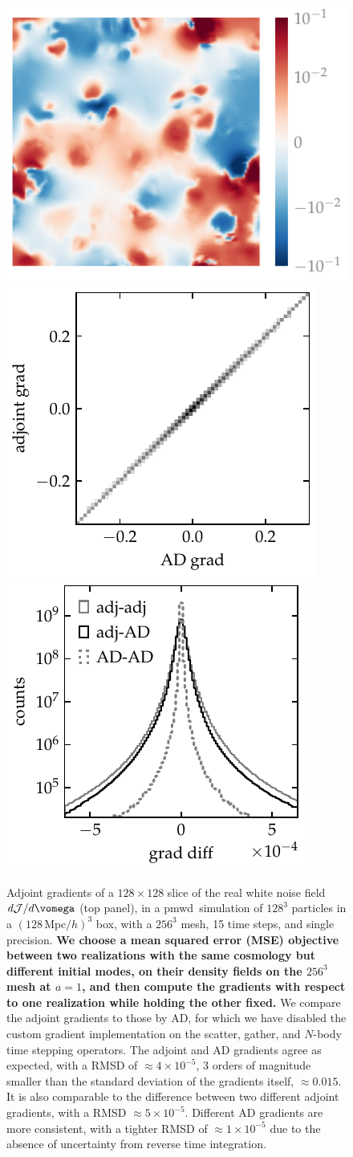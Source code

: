 \documentclass[modern, dvipsnames]{aastex631}
\newcommand{\pmwd}{{\usefont{T1}{nova}{m}{sl}pmwd}}
\renewcommand{\d}{d}
\newcommand{\cJ}{\mathcal{J}}
\newcommand{\Mpc}{\mathrm{Mpc}}
\newcommand{\HL}[1]{\textcolor{Bittersweet}{\textbf{#1}}}
\begin{document}
\begin{figure}[t]
\centering
\hspace{7em}
\includegraphics[width=0.5\linewidth]{grads.pdf}
\\
\vspace{1em}
\includegraphics[height=0.45\linewidth]{grads_cmp.pdf}
\hfill
\includegraphics[height=0.45\linewidth]{grads_diff.pdf}
\caption{Adjoint gradients of a $128\times128$ slice of the real white
noise field $\d\cJ / \d\vomega$ (top panel), in a \pmwd\ simulation of
$128^3$ particles in a $(128\,\Mpc/h)^3$ box, with a $256^3$ mesh, 15
time steps, and single precision.
\HL{We choose a mean squared error (MSE) objective between two realizations
with the same cosmology but different initial modes, on their density
fields on the $256^3$ mesh at $a=1$, and then compute the gradients with
respect to one realization while holding the other fixed.}
We compare the adjoint gradients to those by AD, for which we have
disabled the custom gradient implementation on the scatter, gather, and
$N$-body time stepping operators.
The adjoint and AD gradients agree as expected, with a RMSD of $\approx
4\times10^{-5}$, 3 orders of magnitude smaller than the standard
deviation of the gradients itself, $\approx 0.015$.
It is also comparable to the difference between two different adjoint
gradients, with a RMSD $\approx 5\times10^{-5}$.
Different AD gradients are more consistent, with a tighter RMSD of
$\approx 1\times10^{-5}$ due to the absence of uncertainty from reverse
time integration.
}
\label{fig:grads}
\end{figure}
\end{document}
